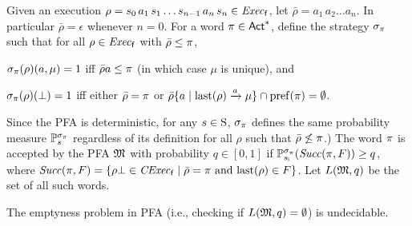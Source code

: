 Given an execution
$\rho = s_0\,a_1\,s_1\ldots s_{n-1}\,a_n\,s_n \in \execf$,
let $\bar{\rho} = a_1\, a_2\ldots a_n$.  In particular
$\bar{\rho} = \epsilon$ whenever $n=0$.
%
For a word $\plan\in\Act^*$, define the strategy $\strat_\plan$ such
that for all $\rho\in\execf$ with $\bar{\rho}\leq\plan$,
%
\begin{enumerate*}[(i)]
\item%
  $\strat_\plan(\rho)(a,\mu)=1$ iff $\bar{\rho}a\leq\plan$ (in which
  case $\mu$ is unique), and
\item%
  $\strat_\plan(\rho)(\complete)=1$ iff either $\bar{\rho}=\plan$ or
  $\bar{\rho}\{a\mid{\last(\rho)\reach{a}\mu}\}\cap\pref(\plan) = \emptyset$.
\end{enumerate*}
%
Since the PFA is deterministic, for any $s\in\S$, $\strat_\plan$
defines the same probability measure $\Prob_s^{\strat_\plan}$
regardless of its definition for all $\rho$ such that
$\bar{\rho}\not\leq\plan$.) 
%
The word $\plan$ is accepted by the PFA $\model$ with probability
$q\in[0,1]$ if $\Prob_{\sini}^{\strat_\plan}(\Succ(\plan,F))\geq q$, where
$\Succ(\plan,F)=\{{\rho\complete\in\cexecf}\mid{\bar{\rho}=\plan \text{ and } \last(\rho)\in F}\}$.
%
Let $L(\model,q)$ be the set of all such words.

\begin{proposition}{\cite{MadaniHC99}}\label{prop:empty:PFA:undecidable}
  The emptyness problem in PFA (i.e., checking if
  $L(\model,q)=\emptyset$) is undecidable.
\end{proposition}


